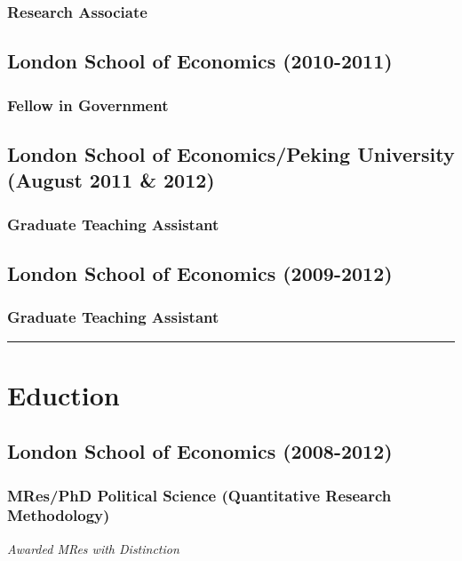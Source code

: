 \documentclass[a4paper]{article}
\begin{document}
\subsubsection*{Research Associate}

\subsection*{London School of Economics (2010-2011)}
\subsubsection*{Fellow in Government}

\subsection*{London School of Economics/Peking University (August 2011 \& 2012)}
\subsubsection*{Graduate Teaching Assistant}

\subsection*{London School of Economics (2009-2012)}
\subsubsection*{Graduate Teaching Assistant}

\vspace{0.25cm}
\medskip\hrule height 1pt
\vspace{0.5cm}


\section*{Eduction}

\subsection*{London School of Economics (2008-2012)}
\subsubsection*{MRes/PhD Political Science (Quantitative Research Methodology)}

\emph{Awarded MRes with Distinction} \\
\end{document}
